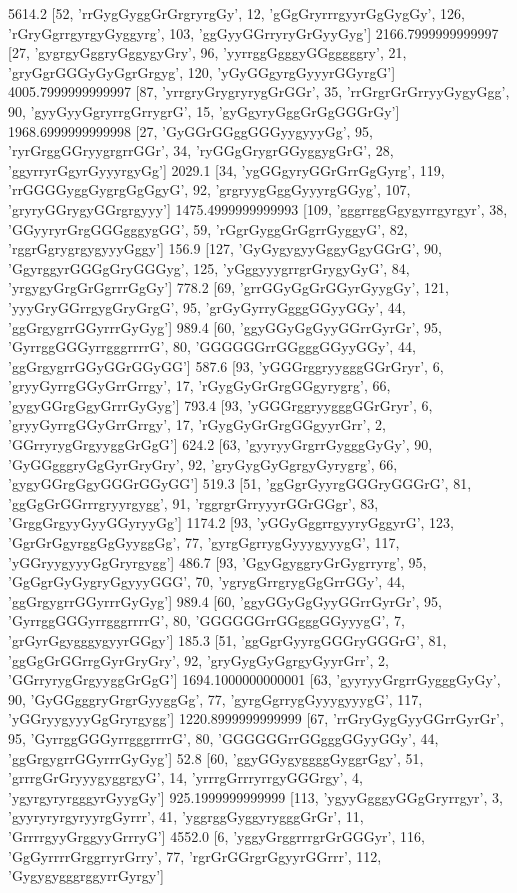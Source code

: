 5614.2 [52, 'rrGygGyggGrGrgryrgGy', 12, 'gGgGryrrrgyyrGgGygGy', 126, 'rGryGgrrgyrgyGyggyrg', 103, 'ggGyyGGrryryGrGyyGyg']
2166.7999999999997 [27, 'gygrgyGggryGggygyGry', 96, 'yyrrggGgggyGGgggggry', 21, 'gryGgrGGGyGyGgrGrgyg', 120, 'yGyGGgyrgGyyyrGGyrgG']
4005.7999999999997 [87, 'yrrgryGrygryrygGrGGr', 35, 'rrGrgrGrGrryyGygyGgg', 90, 'gyyGyyGgryrrgGrrygrG', 15, 'gyGgyryGggGrGgGGGrGy']
1968.6999999999998 [27, 'GyGGrGGggGGGyygyyyGg', 95, 'ryrGrggGGryygrgrrGGr', 34, 'ryGGgGrygrGGyggygGrG', 28, 'ggyrryrGgyrGyyyrgyGg']
2029.1 [34, 'ygGGgyryGGrGrrGgGyrg', 119, 'rrGGGGyggGygrgGgGgyG', 92, 'grgryygGggGyyyrgGGyg', 107, 'gryryGGrygyGGrgrgyyy']
1475.4999999999993 [109, 'gggrrggGgygyrrgyrgyr', 38, 'GGyyryrGrgGGGgggygGG', 59, 'rGgrGyggGrGgrrGyggyG', 82, 'rggrGgrygrgygyyyGggy']
156.9 [127, 'GyGygygyyGggyGgyGGrG', 90, 'GgyrggyrGGGgGryGGGyg', 125, 'yGggyyygrrgrGrygyGyG', 84, 'yrgygyGrgGrGgrrrGgGy']
778.2 [69, 'grrGGyGgGrGGyrGyygGy', 121, 'yyyGryGGrrgygGryGrgG', 95, 'grGyGyrryGgggGGyyGGy', 44, 'ggGrgygrrGGyrrrGyGyg']
989.4 [60, 'ggyGGyGgGyyGGrrGyrGr', 95, 'GyrrggGGGyrrgggrrrrG', 80, 'GGGGGGrrGGgggGGyyGGy', 44, 'ggGrgygrrGGyGGrGGyGG']
587.6 [93, 'yGGGrggryygggGGrGryr', 6, 'gryyGyrrgGGyGrrGrrgy', 17, 'rGygGyGrGrgGGgyrygrg', 66, 'gygyGGrgGgyGrrrGyGyg']
793.4 [93, 'yGGGrggryygggGGrGryr', 6, 'gryyGyrrgGGyGrrGrrgy', 17, 'rGygGyGrGrgGGgyyrGrr', 2, 'GGrryrygGrgyyggGrGgG']
624.2 [63, 'gyyryyGrgrrGygggGyGy', 90, 'GyGGgggryGgGyrGryGry', 92, 'gryGygGyGgrgyGyrygrg', 66, 'gygyGGrgGgyGGGrGGyGG']
519.3 [51, 'ggGgrGyyrgGGGryGGGrG', 81, 'ggGgGrGGrrrgryyrgygg', 91, 'rggrgrGrryyyrGGrGGgr', 83, 'GrggGrgyyGyyGGyryyGg']
1174.2 [93, 'yGGyGggrrgyyryGggyrG', 123, 'GgrGrGgyrggGgGyyggGg', 77, 'gyrgGgrrygGyyygyyygG', 117, 'yGGryygyyyGgGryrgygg']
486.7 [93, 'GgyGgyggryGrGygrryrg', 95, 'GgGgrGyGygryGgyyyGGG', 70, 'ygrygGrrgrygGgGrrGGy', 44, 'ggGrgygrrGGyrrrGyGyg']
989.4 [60, 'ggyGGyGgGyyGGrrGyrGr', 95, 'GyrrggGGGyrrgggrrrrG', 80, 'GGGGGGrrGGgggGGyyygG', 7, 'grGyrGgygggygyyrGGgy']
185.3 [51, 'ggGgrGyyrgGGGryGGGrG', 81, 'ggGgGrGGrrgGyrGryGry', 92, 'gryGygGyGgrgyGyyrGrr', 2, 'GGrryrygGrgyyggGrGgG']
1694.1000000000001 [63, 'gyyryyGrgrrGygggGyGy', 90, 'GyGGgggryGrgrGyyggGg', 77, 'gyrgGgrrygGyyygyyygG', 117, 'yGGryygyyyGgGryrgygg']
1220.8999999999999 [67, 'rrGryGygGyyGGrrGyrGr', 95, 'GyrrggGGGyrrgggrrrrG', 80, 'GGGGGGrrGGgggGGyyGGy', 44, 'ggGrgygrrGGyrrrGyGyg']
52.8 [60, 'ggyGGygyggggGyggrGgy', 51, 'grrrgGrGryyygyggrgyG', 14, 'yrrrgGrrryrrgyGGGrgy', 4, 'ygyrgyryrgggyrGyygGy']
925.1999999999999 [113, 'ygyyGgggyGGgGryrrgyr', 3, 'gyyryryrgyryyrgGyrrr', 41, 'yggrggGyggyrygggGrGr', 11, 'GrrrrgyyGrggyyGrrryG']
4552.0 [6, 'yggyGrggrrrgrGrGGGyr', 116, 'GgGyrrrrGrggrryrGrry', 77, 'rgrGrGGrgrGgyyrGGrrr', 112, 'GygygygggrggyrrGyrgy']
